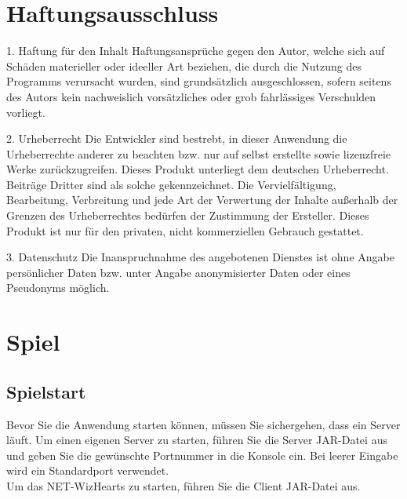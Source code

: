 \documentclass[titlepage,10pt,a4paper]{article}
\begin{document}
\section{Haftungsausschluss}

1. Haftung für den Inhalt
Haftungsansprüche gegen den Autor, welche sich auf Schäden materieller oder ideeller Art beziehen, die durch die Nutzung des Programms verursacht wurden, sind grundsätzlich ausgeschlossen, sofern seitens des Autors kein nachweislich vorsätzliches oder grob fahrlässiges Verschulden vorliegt.

2. Urheberrecht
Die Entwickler sind bestrebt, in dieser Anwendung die Urheberrechte anderer zu beachten bzw. nur auf selbst erstellte sowie lizenzfreie Werke zurückzugreifen.
Dieses Produkt unterliegt dem deutschen Urheberrecht. Beiträge Dritter sind als solche gekennzeichnet. Die Vervielfältigung, Bearbeitung, Verbreitung und jede Art der Verwertung der Inhalte außerhalb der Grenzen des Urheberrechtes bedürfen der Zustimmung der Ersteller. Dieses Produkt ist  nur für den privaten, nicht kommerziellen Gebrauch gestattet.

3. Datenschutz
Die Inanspruchnahme des angebotenen Dienstes ist ohne Angabe persönlicher Daten bzw. unter Angabe anonymisierter Daten oder eines Pseudonyms möglich.
\\

\section{Spiel}
\subsection{Spielstart}
Bevor Sie die Anwendung starten können, müssen Sie sichergehen, dass ein \gls{Server} läuft. Um einen eigenen \gls{Server} zu starten, führen Sie die \gls{Server} JAR-Datei aus und geben Sie die gewünschte Portnummer in die Konsole ein. Bei leerer Eingabe wird ein Standardport verwendet.\\
Um das NET-WizHearts zu starten, führen Sie die Client JAR-Datei aus.\\
\end{document}

